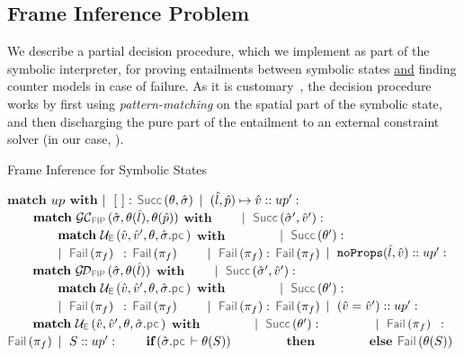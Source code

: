 \subsection{Frame Inference Problem}\label{subsec:fip}

We describe a partial decision procedure, which we  
implement as part of the \jsil symbolic interpreter, for proving entailments 
between symbolic states \underline{and} finding counter 
models in case of failure.  
As it is customary~\cite{javert,jacobs2011verifast,sepwithsmt}, the decision procedure works by first using \emph{pattern-matching} 
on the spatial part of the symbolic state, and then discharging the pure part of the 
entailment to an external constraint solver (in our case, \rosette). 

\begin{algorithm}
\caption{Frame Inference for Symbolic States}\label{fip:symb:states}
\begin{algorithmic}[1]
    \State $\textbf{match}$ $up$ $\textbf{with}$
    \State $\mid~[ \ ]:$ \Return $\success{\subst, \sstate}$
    \State $\mid~(\hat{l}, \hat{p}) \mapsto \hat{v} :: up' :$ 
    \State $\qquad \textbf{match} \ \GetCellV{\sstate, \subst(\sloc), \subst(\sexprp)}$ $\textbf{with}$
    \State $\qquad \mid~\success{\sstate', \sexprv'}:$
    \State $\qquad \qquad \textbf{match} \ \unifylexpr(\sexprv, \sexprv', \subst, \sstate.\pcsel)$ $\textbf{with}$
     \State $\qquad \qquad \mid~ \success{\subst'}:$ \Return {}
      \State $\qquad \qquad \mid~ \fail{\pc_f} \ \, :$ \Return $\fail{\pc_f}$
      \State $\qquad \mid~\fail{\pc_f}:$ \Return $\fail{\pc_f}$
     \State $\mid~\texttt{noProps}(\hat{l}, \hat{v}) :: up' :$  
       \State $\qquad \textbf{match} \ \GetDomainV{\sstate, \subst(\sloc)}$ $\textbf{with}$
       \State $\qquad \mid~\success{\sstate', \sexprv'}:$
         \State $\qquad \qquad \textbf{match} \ \unifylexpr(\sexprv, \sexprv', \subst, \sstate.\pcsel)$ $\textbf{with}$
       \State $\qquad \qquad \mid~ \success{\subst'}:$ \Return {}
       \State $\qquad \qquad \mid~ \fail{\pc_f} \ \, :$ \Return $\fail{\pc_f}$
       \State $\qquad \mid~\fail{\pc_f}:$ \Return $\fail{\pc_f}$
     \State $\mid~(\hat{v} = \hat{v}') :: up' :$  
        \State $\qquad \textbf{match} \ \unifylexpr(\sexprv, \sexprv', \subst, \sstate.\pcsel)$ $\textbf{with}$
         \State $\qquad \qquad \mid~ \success{\subst'}:$ \Return {}
       \State $\qquad \qquad \mid~ \fail{\pc_f} \ \, :$ \Return $\fail{\pc_f}$
     \State $\mid~S :: up' :$   
      \State $\qquad \textbf{if} \,(\sstate.\pcsel \vdash \subst(\sass))$
       \State $\qquad \qquad \textbf{then}$ \Return  {}
      \State $\qquad \qquad \textbf{else}$  \Return $\fail{\subst(\sass)}$
\EndFunction
\end{algorithmic}
\end{algorithm}

